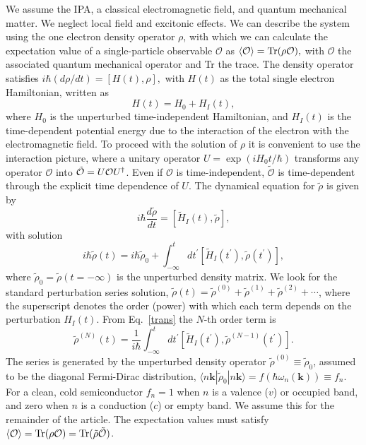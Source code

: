 \documentclass[floatfix,prb,aps,superscriptaddress,showpacs,letterpaper]{revtex4}
\begin{document}
We assume the IPA, a classical electromagnetic field, and quantum mechanical 
matter. We neglect local field and excitonic effects. We can describe the 
system using 
the one electron density operator ${\rho}$, with which we can calculate the 
expectation value of a single-particle observable $\mathcal{O}$ as 
$\langle{\cal O}\rangle = \mbox{Tr}({\rho}{\cal O}),\label{calo}$
with $\mathcal{O}$ the associated quantum mechanical operator and Tr the 
trace. The density operator satisfies
$i\hbar(d{\rho}/dt) = [H(t), {\rho}], \label{rho}$
with $H(t)$ as the total single electron Hamiltonian, written as 
\begin{equation*}
H(t) = H_{0} + H_{I}(t),  
\label{ache}
\end{equation*}
where $H_{0}$ is the unperturbed time-independent Hamiltonian, and $H_{I}(t)$
is the time-dependent potential energy due to the interaction of the electron 
with the electromagnetic field.
To proceed with the solution of $\rho$ it is convenient to use the interaction 
picture, where a unitary operator $U = \exp({iH_{0}t/\hbar})$ transforms any 
operator $\mathcal{O}$ into $\tilde{\mathcal{O}} = U{\cal O}U^{\dagger}$. 
Even if $\mathcal{O}$ is time-independent, $\tilde{\mathcal{O}}$ is 
time-dependent through the explicit time dependence of $U$. The dynamical 
equation for $\tilde{\rho}$ is given by
\begin{equation*}
i\hbar \frac{d\tilde{\rho}}{dt} = [\tilde{H}_{I}(t), \tilde{\rho}],
\label{rho1}
\end{equation*}
with solution 
\begin{equation}
i\hbar \tilde{\rho}(t) = 
    i\hbar \tilde{\rho}_{0} + 
    \int_{-\infty}^{t}dt^{\prime}
    [\tilde{H}_{I}(t^{\prime}),\tilde{\rho}(t^{\prime})],  
\label{trans}
\end{equation}
where $\tilde{\rho}_{0} = \tilde{\rho}(t = -\infty)$ is the unperturbed 
density matrix. We look for the standard perturbation series solution, 
$\tilde{\rho}(t) = \tilde{\rho}^{(0)} + \tilde{\rho}^{(1)} + 
\tilde{\rho}^{(2)} + \cdots$, where the superscript denotes the order (power) 
with which each term depends on the perturbation $H_{I}(t)$. From 
Eq.~\eqref{trans} the $N$-th order term is 
\begin{equation}
\tilde{\rho}^{(N)}(t) = 
    \frac{1}{i\hbar}\int_{-\infty }^{t}dt^{\prime}
    [\tilde{H}_{I}(t^{\prime }), \tilde{\rho}^{(N - 1)}(t^{\prime})].
\label{rhop}
\end{equation}
The series is generated by the unperturbed density operator $\tilde{\rho}^{(0)}
\equiv \tilde{\rho}_{0}$, assumed to be the diagonal Fermi-Dirac distribution, 
$\langle n\mathbf{k}|\tilde{\rho}_{0}|n\mathbf{k}\rangle = 
f(\hbar\omega_{n}(\mathbf{k}))\equiv f_{n}$. For a clean, cold semiconductor 
$f_{n}=1$ when $n$ is a valence ($v$) or occupied band, and zero when $n$ is 
a conduction ($c$) or empty band. We assume this for the remainder of the 
article. The expectation values must satisfy
$\langle{\cal O}\rangle = \mbox{Tr}({\rho}{\cal O}) = 
\mbox{Tr}(\tilde{\rho}\tilde{\cal O})$.  
\end{document}
